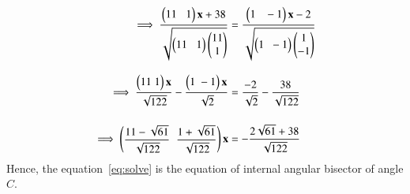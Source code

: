\documentclass[journal,12pt,twocolumn]{IEEEtran}
\theoremstyle{remark}
\begin{document}
\begin{align}
\implies\dfrac{\begin{pmatrix}11\;\;\;1\end{pmatrix}\mathbf{x}+38}{\sqrt{\begin{pmatrix}11\;\;\;1\end{pmatrix}\begin{pmatrix}11\\1\end{pmatrix}}}&=\dfrac{\begin{pmatrix}1\;\;\;-1\end{pmatrix}\mathbf{x}-2}{\sqrt{\begin{pmatrix}1\;\;-1\end{pmatrix}\begin{pmatrix}1\\-1\end{pmatrix}}}\\[8pt]
\implies\dfrac{\begin{pmatrix}11\;1\end{pmatrix}\mathbf{x}}{\sqrt{122}} - \dfrac{\begin{pmatrix}1\;-1\end{pmatrix}\mathbf{x}}{\sqrt{2}}&=\dfrac{-2}{\sqrt{2}} - \dfrac{38}{\sqrt{122}}\\[12pt]
\label{eq:solve}\implies\begin{pmatrix}\dfrac{11-\sqrt{61}}{\sqrt{122}} \;\; \dfrac{1+\sqrt{61}}{\sqrt{122}}\end{pmatrix}\mathbf{x}&=-\dfrac{2\sqrt{61}+38}{\sqrt{122}}
\end{align}
Hence, the equation~\eqref{eq:solve} is the equation of internal angular bisector of angle $C$.
\end{document}
